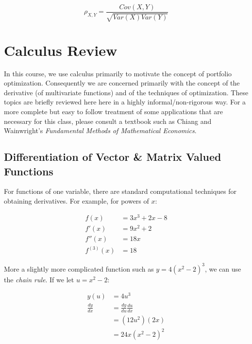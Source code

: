 \documentclass[]{book}
\theoremstyle{definition}
\theoremstyle{definition}
\theoremstyle{definition}
\theoremstyle{remark}
\begin{document}
\begin{equation}
\rho_{X,Y} = \frac{Cov(X,Y)}{\sqrt{Var(X)Var(Y)}}
\end{equation}

\section*{Calculus Review}\label{calculus-review}

In this course, we use calculus primarily to motivate the concept of
portfolio optimization. Consequently we are concerned primarily with the
concept of the derivative (of multivariate functions) and of the
techniques of optimization. These topics are briefly reviewed here here
in a highly informal/non-rigorous way. For a more complete but easy to
follow treatment of some applications that are necessary for this class,
please consult a textbook such as Chiang and Wainwright's
\emph{Fundamental Methods of Mathematical Economics}.

\subsection*{Differentiation of Vector \& Matrix Valued
Functions}\label{differentiation-of-vector-matrix-valued-functions}

For functions of one variable, there are standard computational
techniques for obtaining derivatives. For example, for powers of \(x\):

\begin{align*}
f(x) &= 3x^3 + 2x - 8\\
f'(x) &= 9x^2 + 2\\
f''(x) &= 18x\\
f^{(3)}(x) &= 18
\end{align*}

More a slightly more complicated function such as \(y = 4(x^2-2)^3\), we
can use the \textit{chain rule}. If we let \(u = x^2 - 2\):

\begin{align*}
y(u) &= 4u^3\\
\frac{dy}{dx} &= \frac{dy}{du}\frac{du}{dx}\\
&= (12u^2)(2x)\\
&= 24x(x^2 - 2)^2
\end{align*}
\end{document}
